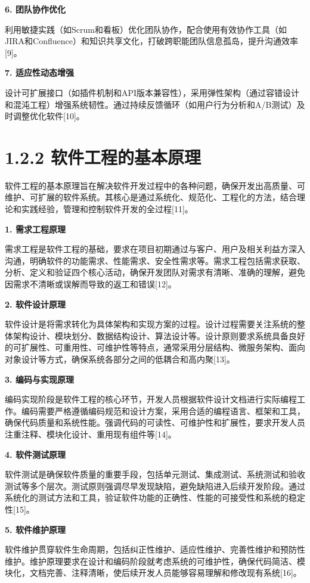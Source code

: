 \documentclass[12pt,a4paper]{ctexbook}
\begin{document}
\textbf{6. 团队协作优化}

利用敏捷实践（如Scrum和看板）优化团队协作，配合使用有效协作工具（如JIRA和Confluence）和知识共享文化，打破跨职能团队信息孤岛，提升沟通效率{[}9{]}。

\textbf{7. 适应性动态增强}

设计可扩展接口（如插件机制和API版本兼容性），采用弹性架构（通过容错设计和混沌工程）增强系统韧性。通过持续反馈循环（如用户行为分析和A/B测试）及时调整优化软件{[}10{]}。


\section{1.2.2
软件工程的基本原理}\label{ux8f6fux4ef6ux5de5ux7a0bux7684ux57faux672cux539fux7406}

软件工程的基本原理旨在解决软件开发过程中的各种问题，确保开发出高质量、可维护、可扩展的软件系统。其核心是通过系统化、规范化、工程化的方法，结合理论和实践经验，管理和控制软件开发的全过程{[}11{]}。

\textbf{1. 需求工程原理}

需求工程是软件工程的基础，要求在项目初期通过与客户、用户及相关利益方深入沟通，明确软件的功能需求、性能需求、安全性需求等。需求工程包括需求获取、分析、定义和验证四个核心活动，确保开发团队对需求有清晰、准确的理解，避免因需求不清晰或误解而导致的返工和错误{[}12{]}。

\textbf{2. 软件设计原理}

软件设计是将需求转化为具体架构和实现方案的过程。设计过程需要关注系统的整体架构设计、模块划分、数据结构设计、算法设计等。设计原则要求系统具备良好的可扩展性、可重用性、可维护性等特点，通常采用分层结构、微服务架构、面向对象设计等方式，确保系统各部分之间的低耦合和高内聚{[}13{]}。

\textbf{3. 编码与实现原理}

编码实现阶段是软件工程的核心环节，开发人员根据软件设计文档进行实际编程工作。编码需要严格遵循编码规范和设计方案，采用合适的编程语言、框架和工具，确保代码质量和系统性能。强调代码的可读性、可维护性和扩展性，要求开发人员注重注释、模块化设计、重用现有组件等{[}14{]}。

\textbf{4. 软件测试原理}

软件测试是确保软件质量的重要手段，包括单元测试、集成测试、系统测试和验收测试等多个层次。测试原则强调尽早发现缺陷，避免缺陷进入后续开发阶段。通过系统化的测试方法和工具，验证软件功能的正确性、性能的可接受性和系统的稳定性{[}15{]}。

\textbf{5. 软件维护原理}

软件维护贯穿软件生命周期，包括纠正性维护、适应性维护、完善性维护和预防性维护。维护原理要求在设计和编码阶段就考虑系统的可维护性，确保代码简洁、模块化，文档完善、注释清晰，使后续开发人员能够容易理解和修改现有系统{[}16{]}。
\end{document}
